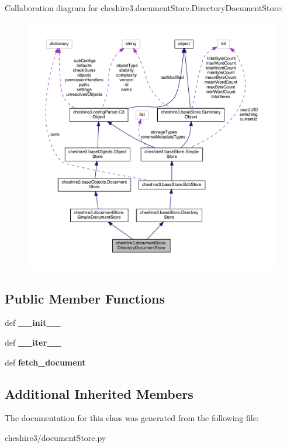 Collaboration diagram for cheshire3.\-document\-Store.\-Directory\-Document\-Store\-:
\nopagebreak
\begin{figure}[H]
\begin{center}
\leavevmode
\includegraphics[width=350pt]{classcheshire3_1_1document_store_1_1_directory_document_store__coll__graph}
\end{center}
\end{figure}
\subsection*{Public Member Functions}
\begin{DoxyCompactItemize}
\item 
\hypertarget{classcheshire3_1_1document_store_1_1_directory_document_store_a04ba2e51dc6ebffb3a23460a8eef4df2}{def {\bfseries \-\_\-\-\_\-init\-\_\-\-\_\-}}\label{classcheshire3_1_1document_store_1_1_directory_document_store_a04ba2e51dc6ebffb3a23460a8eef4df2}

\item 
\hypertarget{classcheshire3_1_1document_store_1_1_directory_document_store_a5fb6d207d2feb14a10c1c4b712d00955}{def {\bfseries \-\_\-\-\_\-iter\-\_\-\-\_\-}}\label{classcheshire3_1_1document_store_1_1_directory_document_store_a5fb6d207d2feb14a10c1c4b712d00955}

\item 
\hypertarget{classcheshire3_1_1document_store_1_1_directory_document_store_ad5fc18c394baaa5ecd1e1638f8ee3f2d}{def {\bfseries fetch\-\_\-document}}\label{classcheshire3_1_1document_store_1_1_directory_document_store_ad5fc18c394baaa5ecd1e1638f8ee3f2d}

\end{DoxyCompactItemize}
\subsection*{Additional Inherited Members}


The documentation for this class was generated from the following file\-:\begin{DoxyCompactItemize}
\item 
cheshire3/document\-Store.\-py\end{DoxyCompactItemize}
